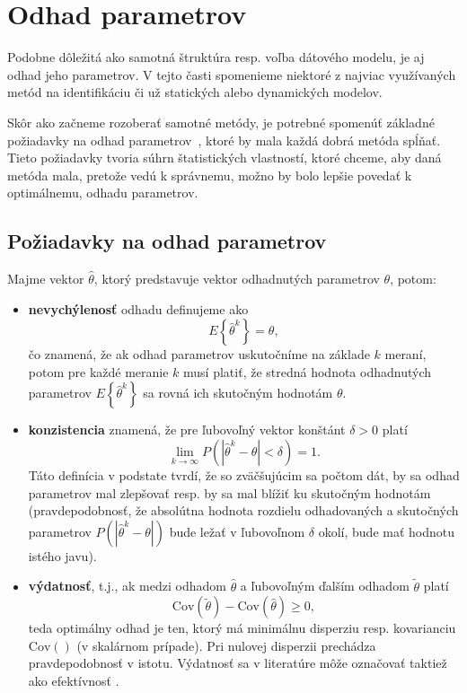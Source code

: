 \section{Odhad parametrov}
Podobne dôležitá ako samotná štruktúra resp. voľba dátového modelu, je aj odhad jeho parametrov. V tejto časti spomenieme niektoré z najviac využívaných metód na identifikáciu či už statických alebo dynamických modelov. 

Skôr ako začneme rozoberať samotné metódy, je potrebné spomenúť základné požiadavky na odhad parametrov~\cite{beck:param_est:1977}, ktoré by mala každá dobrá metóda spĺňať. Tieto požiadavky tvoria súhrn štatistických vlastností, ktoré chceme, aby daná metóda mala, pretože vedú k správnemu, možno by bolo lepšie povedať k optimálnemu, odhadu parametrov.

\subsection{Požiadavky na odhad parametrov}
Majme vektor $ \hat{\theta} $, ktorý predstavuje vektor odhadnutých parametrov $ \theta $, potom:
\begin{itemize}
	\item[] \textbf{nevychýlenosť} odhadu definujeme ako
	\begin{equation*}
		E\left\lbrace \hat{\theta}^k \right\rbrace = \theta, 
	\end{equation*}
	čo znamená, že ak odhad parametrov uskutočníme na základe $ k $ meraní, potom pre každé meranie $ k $ musí platiť, že stredná hodnota odhadnutých parametrov $ E\left\lbrace \hat{\theta}^k \right\rbrace $ sa rovná ich skutočným hodnotám $ \theta $.
	\item[] \textbf{konzistencia} znamená, že pre ľubovoľný vektor konštánt $ \delta > 0 $ platí
	\begin{equation*}
		\lim\limits_{k \rightarrow \infty} P \left( \left| \hat{\theta}^k - \theta \right| < \delta \right) = 1. 
	\end{equation*}
	Táto definícia v podstate tvrdí, že so zväčšujúcim sa počtom dát, by sa odhad parametrov mal zlepšovať resp. by sa mal blížiť ku skutočným hodnotám (pravdepodobnosť, že absolútna hodnota rozdielu odhadovaných a skutočných parametrov $ P \left( \left| \hat{\theta}^k - \theta \right| \right) $ bude ležať v ľubovoľnom $ \delta $ okolí, bude mať hodnotu istého javu).
	\item[] \textbf{výdatnosť}, t.j., ak medzi odhadom $ \hat{\theta} $ a ľubovoľným ďalším odhadom $ \tilde{\theta} $ platí 
	\begin{equation*}
		\text{Cov} \left( \tilde{\theta} \right) - \text{Cov} \left( \hat{\theta} \right) \geq 0,
	\end{equation*}
	teda optimálny odhad je ten, ktorý má minimálnu disperziu resp. kovarianciu $ \text{Cov} \left(\right) $ (v skalárnom prípade). Pri nulovej disperzii prechádza pravdepodobnosť v istotu. Výdatnosť sa v literatúre môže označovať taktiež ako efektívnosť \cite{beck:param_est:1977}.
\end{itemize}

